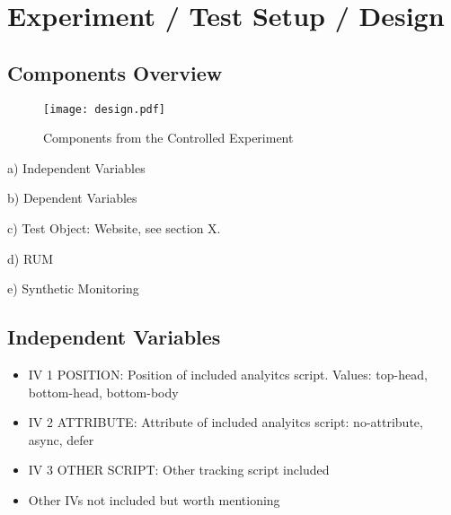 





\section{Experiment / Test Setup / Design}







\subsection{Components Overview}


\begin{figure}[h!]
\begin{center}
\texttt{[image: design.pdf]}
\caption{Components from the Controlled Experiment}
\label{figure:design_setup}
\end{center}
\end{figure}

a) Independent Variables

b) Dependent Variables

c) Test Object: Website, see section X.

d) RUM

e) Synthetic Monitoring




\subsection{Independent Variables}

\begin{itemize}
\item IV 1 POSITION: Position of included analyitcs script. Values: top-head, bottom-head, bottom-body
\item IV 2 ATTRIBUTE: Attribute of included analyitcs script: no-attribute, async, defer
\item IV 3 OTHER SCRIPT: Other tracking script included
\item Other IVs not included but worth mentioning
\end{itemize}


